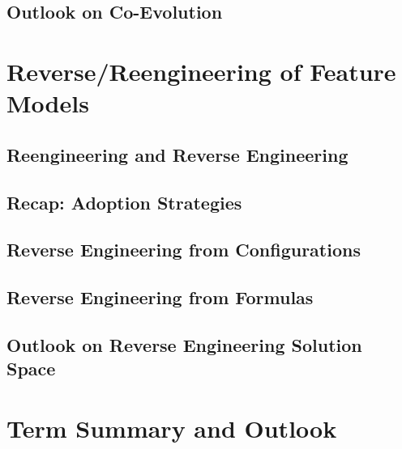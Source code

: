 \subsection{Outlook on Co-Evolution}
\lessonslearned{
	\item \ldots
}{
	\item \ldots
}{
	\ldots
}

\section{Reverse/Reengineering of Feature Models}
\subsection{Reengineering and Reverse Engineering}
\subsection{Recap: Adoption Strategies}
\subsection{Reverse Engineering from Configurations}
\subsection{Reverse Engineering from Formulas}
\subsection{Outlook on Reverse Engineering Solution Space}
\lessonslearned{
	\item \ldots
}{
	\item \ldots
}{
	\ldots
}

\section{Term Summary and Outlook}
